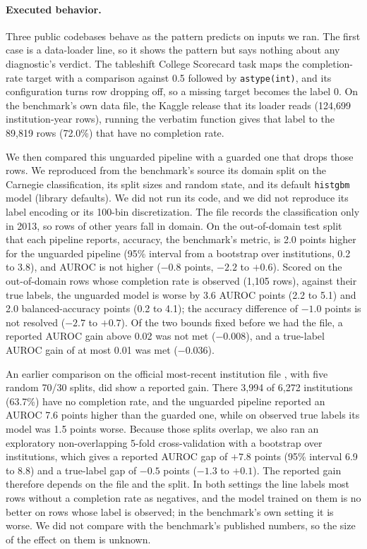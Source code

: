 \documentclass[10pt]{article}
\theoremstyle{definition}
\begin{document}
\paragraph{Executed behavior.} Three public codebases behave as the pattern predicts on inputs we ran. The first case is a data-loader line, so it shows the pattern but says nothing about any diagnostic's verdict. The tableshift College Scorecard task \citep{gardner2023tableshift} maps the completion-rate target with a comparison against 0.5 followed by \texttt{astype(int)}, and its configuration turns row dropping off, so a missing target becomes the label 0. On the benchmark's own data file, the Kaggle release that its loader reads (124,699 institution-year rows), running the verbatim function gives that label to the 89,819 rows (72.0\%) that have no completion rate.

We then compared this unguarded pipeline with a guarded one that drops those rows. We reproduced from the benchmark's source its domain split on the Carnegie classification, its split sizes and random state, and its default \texttt{histgbm} model (library defaults). We did not run its code, and we did not reproduce its label encoding or its 100-bin discretization. The file records the classification only in 2013, so rows of other years fall in domain. On the out-of-domain test split that each pipeline reports, accuracy, the benchmark's metric, is 2.0 points higher for the unguarded pipeline (95\% interval from a bootstrap over institutions, 0.2 to 3.8), and AUROC is not higher ($-0.8$ points, $-2.2$ to $+0.6$). Scored on the out-of-domain rows whose completion rate is observed (1,105 rows), against their true labels, the unguarded model is worse by 3.6 AUROC points (2.2 to 5.1) and 2.0 balanced-accuracy points (0.2 to 4.1); the accuracy difference of $-1.0$ points is not resolved ($-2.7$ to $+0.7$). Of the two bounds fixed before we had the file, a reported AUROC gain above 0.02 was not met ($-0.008$), and a true-label AUROC gain of at most 0.01 was met ($-0.036$).

An earlier comparison on the official most-recent institution file \citep{collegescorecard}, with five random 70/30 splits, did show a reported gain. There 3,994 of 6,272 institutions (63.7\%) have no completion rate, and the unguarded pipeline reported an AUROC 7.6 points higher than the guarded one, while on observed true labels its model was 1.5 points worse. Because those splits overlap, we also ran an exploratory non-overlapping 5-fold cross-validation with a bootstrap over institutions, which gives a reported AUROC gap of $+7.8$ points (95\% interval 6.9 to 8.8) and a true-label gap of $-0.5$ points ($-1.3$ to $+0.1$). The reported gain therefore depends on the file and the split. In both settings the line labels most rows without a completion rate as negatives, and the model trained on them is no better on rows whose label is observed; in the benchmark's own setting it is worse. We did not compare with the benchmark's published numbers, so the size of the effect on them is unknown.
\end{document}
